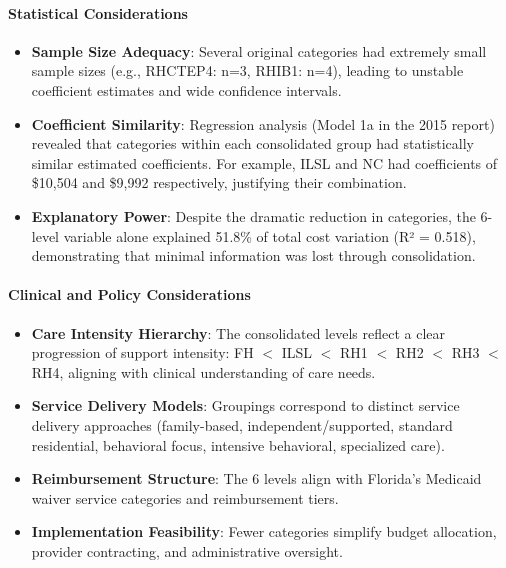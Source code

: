 \paragraph{Statistical Considerations}
\begin{itemize}
    \item \textbf{Sample Size Adequacy}: Several original categories had extremely small sample sizes (e.g., RHCTEP4: n=3, RHIB1: n=4), leading to unstable coefficient estimates and wide confidence intervals.
    
    \item \textbf{Coefficient Similarity}: Regression analysis (Model 1a in the 2015 report) revealed that categories within each consolidated group had statistically similar estimated coefficients. For example, ILSL and NC had coefficients of \$10,504 and \$9,992 respectively, justifying their combination.
    
    \item \textbf{Explanatory Power}: Despite the dramatic reduction in categories, the 6-level variable alone explained 51.8\% of total cost variation (R² = 0.518), demonstrating that minimal information was lost through consolidation.
\end{itemize}

\paragraph{Clinical and Policy Considerations}
\begin{itemize}
    \item \textbf{Care Intensity Hierarchy}: The consolidated levels reflect a clear progression of support intensity: FH $<$ ILSL $<$ RH1 $<$ RH2 $<$ RH3 $<$ RH4, aligning with clinical understanding of care needs.
    
    \item \textbf{Service Delivery Models}: Groupings correspond to distinct service delivery approaches (family-based, independent/supported, standard residential, behavioral focus, intensive behavioral, specialized care).
    
    \item \textbf{Reimbursement Structure}: The 6 levels align with Florida's Medicaid waiver service categories and reimbursement tiers.
    
    \item \textbf{Implementation Feasibility}: Fewer categories simplify budget allocation, provider contracting, and administrative oversight.
\end{itemize}

